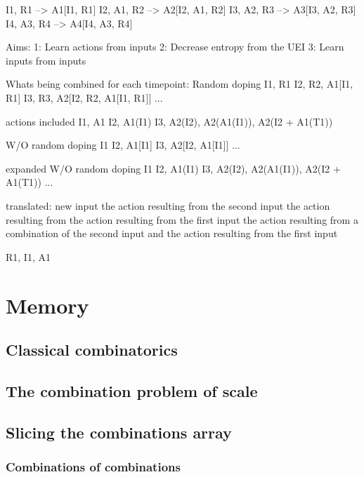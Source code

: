 \documentclass{book}
\begin{document}
I1, R1        -->    A1[I1, R1]
I2, A1, R2    -->    A2[I2, A1, R2]
I3, A2, R3    -->    A3[I3, A2, R3]
I4, A3, R4    -->    A4[I4, A3, R4]

Aims:
1: Learn actions from inputs
2: Decrease entropy from the UEI
3: Learn inputs from inputs

Whats being combined for each timepoint:
Random doping
I1, R1
I2, R2, A1[I1, R1]
I3, R3, A2[I2, R2, A1[I1, R1]]
...

actions included
I1, A1
I2, A1(I1)
I3, A2(I2), A2(A1(I1)), A2(I2 + A1(T1))

W/O random doping
I1
I2, A1[I1]
I3, A2[I2, A1[I1]]
...

expanded W/O random doping
I1
I2, A1(I1)
I3, A2(I2), A2(A1(I1)), A2(I2 + A1(T1))
...

translated:
new input
the action resulting from the second input
the action resulting from the action resulting from the first input
the action resulting from a combination of the second input and the action resulting from the first input 

R1, I1, A1

\chapter{Memory}
\section{Classical combinatorics}

\section{The combination problem of scale}

\section{Slicing the combinations array}
\subsection{Combinations of combinations}
\end{document}
